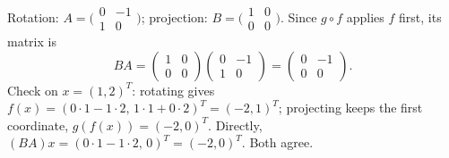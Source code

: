 \begin{solutions}
    \item Rotation: $A = \bigl(\begin{smallmatrix} 0 & -1 \\ 1 & 0 \end{smallmatrix}\bigr)$; projection: $B = \bigl(\begin{smallmatrix} 1 & 0 \\ 0 & 0 \end{smallmatrix}\bigr)$. Since $g \circ f$ applies $f$ first, its matrix is
    \[
    B A = \begin{pmatrix} 1 & 0 \\ 0 & 0 \end{pmatrix}
          \begin{pmatrix} 0 & -1 \\ 1 & 0 \end{pmatrix}
        = \begin{pmatrix} 0 & -1 \\ 0 & 0 \end{pmatrix}.
    \]
    Check on $x = (1, 2)^{T}$: rotating gives $f(x) = (0 \cdot 1 - 1 \cdot 2, \, 1 \cdot 1 + 0 \cdot 2)^{T} = (-2, 1)^{T}$; projecting keeps the first coordinate, $g(f(x)) = (-2, 0)^{T}$. Directly, $(B A) x = (0 \cdot 1 - 1 \cdot 2, \, 0)^{T} = (-2, 0)^{T}$. Both agree.
\end{solutions}
